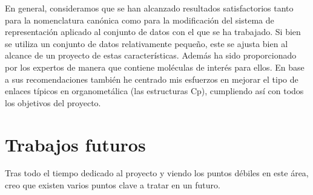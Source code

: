 En general, consideramos que se han alcanzado resultados satisfactorios tanto para la nomenclatura canónica como para la modificación del sistema de representación aplicado al conjunto de datos con el que se ha trabajado. Si bien se utiliza un conjunto de datos relativamente pequeño, este se ajusta bien al alcance de un proyecto de estas características. Además ha sido proporcionado por los expertos de manera que contiene moléculas de interés para ellos. En base a sus recomendaciones también he centrado mis esfuerzos en mejorar el tipo de enlaces típicos en organometálica (las estructuras Cp),
cumpliendo así con todos los objetivos del proyecto.




\section{Trabajos futuros}

Tras todo el tiempo dedicado al proyecto y viendo los puntos débiles en este área, creo que existen varios puntos clave a tratar en un futuro. 

